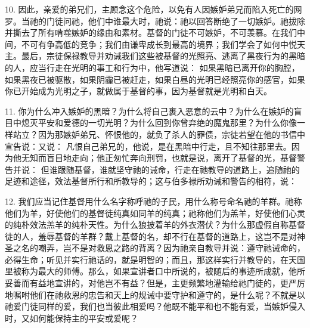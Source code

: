 10. 因此，亲爱的弟兄们，主顾念这个危险，以免有人因嫉妒弟兄而陷入死亡的网罗。当祂的门徒问祂，他们中谁最大时，祂说：祂以回答断绝了一切嫉妒。祂拔除并撕去了所有啃噬嫉妒的缘由和素材。基督的门徒不可嫉妒，不可羡慕。在我们中间，不可有争高低的竞争；我们由谦卑成长到最高的境界；我们学会了如何中悦天主。最后，宗徒保禄教导并劝诫我们这些被基督的光照亮、逃离了黑夜行为的黑暗的人，应当行走在光明的事工和行为中，他写道说： 如果黑暗已离开你的胸膛，如果黑夜已被驱散，如果阴霾已被赶走，如果白昼的光明已经照亮你的感官，如果你已开始成为光明之子，就做属于基督的事，因为基督就是光明和白天。\par

11. 你为什么冲入嫉妒的黑暗？为什么将自己裹入恶意的云中？为什么在嫉妒的盲目中熄灭平安和爱德的一切光明？为什么回到你曾弃绝的魔鬼那里？为什么你像一样站立？因为那嫉妒弟兄、怀恨他的，就负了杀人的罪债，宗徒若望在他的书信中宣告说：又说： 凡恨自己弟兄的，他说，是在黑暗中行走，且不知往那里去。因为他无知而盲目地走向；他正匆忙奔向刑罚，也就是说，离开了基督的光，基督警告并说： 但谁跟随基督，谁就坚守祂的诫命，行走在祂教导的道路上，追随祂的足迹和途径，效法基督所行和所教导的；这与伯多禄所劝诫和警告的相符，说：\par

12. 我们应当记住基督用什么名字称呼祂的子民，用什么称号命名祂的羊群。祂称他们为羊，好使他们的基督徒纯真如同羊的纯真；祂称他们为羔羊，好使他们心灵的纯朴效法羔羊的纯朴天性。为什么狼披着羊的外衣潜伏？为什么那虚假自称基督徒的人，羞辱基督的羊群？戴上基督的名，却不行在基督的道路上，这岂不是对神圣之名的嘲弄，岂不是对救恩之路的背离？因为祂亲自教导并说：遵守祂诫命的，必得生命；听见并实行祂话的，就是明智的；而且，那这样实行并教导的，在天国里被称为最大的师傅。那么，如果宣讲者口中所说的，被随后的事迹所成就，他所妥善而有益地宣讲的，对他岂不有益？但是，主更频繁地灌输给祂门徒的，更严厉地嘱咐他们在祂救恩的忠告和天上的规诫中要守护和遵守的，是什么呢？不就是以祂爱门徒同样的爱，我们也当彼此相爱吗？他既不能平和也不能有爱，当嫉妒侵入时，又如何能保持主的平安或爱呢？\par


